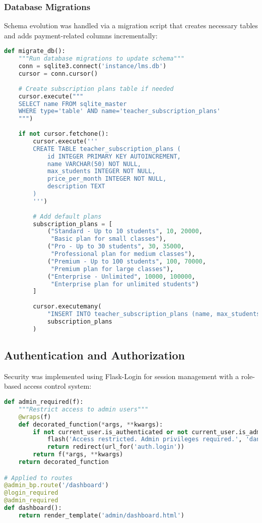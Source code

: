 \subsubsection{Database Migrations}

Schema evolution was handled via a migration script that creates necessary tables and adds payment-related columns incrementally:

\begin{lstlisting}[language=Python, caption=Migration Script Excerpt, label=lst:migration]
def migrate_db():
    """Run database migrations to update schema"""
    conn = sqlite3.connect('instance/lms.db')
    cursor = conn.cursor()
    
    # Create subscription plans table if needed
    cursor.execute("""
    SELECT name FROM sqlite_master
    WHERE type='table' AND name='teacher_subscription_plans'
    """)
    
    if not cursor.fetchone():
        cursor.execute('''
        CREATE TABLE teacher_subscription_plans (
            id INTEGER PRIMARY KEY AUTOINCREMENT,
            name VARCHAR(50) NOT NULL,
            max_students INTEGER NOT NULL,
            price_per_month INTEGER NOT NULL,
            description TEXT
        )
        ''')
        
        # Add default plans
        subscription_plans = [
            ("Standard - Up to 10 students", 10, 20000, 
             "Basic plan for small classes"),
            ("Pro - Up to 30 students", 30, 35000, 
             "Professional plan for medium classes"),
            ("Premium - Up to 100 students", 100, 70000, 
             "Premium plan for large classes"),
            ("Enterprise - Unlimited", 10000, 100000, 
             "Enterprise plan for unlimited students")
        ]
        
        cursor.executemany(
            "INSERT INTO teacher_subscription_plans (name, max_students, price_per_month, description) VALUES (?, ?, ?, ?)",
            subscription_plans
        )
\end{lstlisting}

\subsection{Authentication and Authorization}

Security was implemented using Flask-Login for session management with a role-based access control system:

\begin{lstlisting}[language=Python, caption=Role-Based Access Control, label=lst:rbac]
def admin_required(f):
    """Restrict access to admin users"""
    @wraps(f)
    def decorated_function(*args, **kwargs):
        if not current_user.is_authenticated or not current_user.is_admin():
            flash('Access restricted. Admin privileges required.', 'danger')
            return redirect(url_for('auth.login'))
        return f(*args, **kwargs)
    return decorated_function

# Applied to routes
@admin_bp.route('/dashboard')
@login_required
@admin_required
def dashboard():
    return render_template('admin/dashboard.html')
\end{lstlisting}

